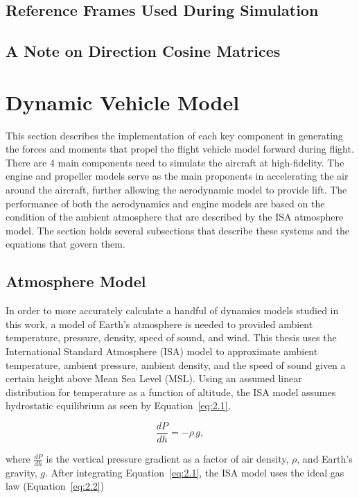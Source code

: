 \documentclass[12pt]{report}
\begin{document}
\subsection{Reference Frames Used During Simulation}

\subsection{A Note on Direction Cosine Matrices}

\section{Dynamic Vehicle Model}
This section describes the implementation of each key component in generating the forces and moments that propel the flight vehicle model forward during flight. There are 4 main components need to simulate the aircraft at high-fidelity. The engine and propeller models serve as the main proponents in accelerating the air around the aircraft, further allowing the aerodynamic model to provide lift. The performance of both the aerodynamics and engine models are based on the condition of the ambient atmosphere that are described by the ISA atmosphere model. The section holds several subsections that describe these systems and the equations that govern them.
\clearpage
\subsection{Atmosphere Model}
In order to more accurately calculate a handful of dynamics models studied in this work, a model of Earth's atmosphere is needed to provided ambient temperature, pressure, density, speed of sound, and wind. This thesis uses the International Standard Atmosphere (ISA) model to approximate ambient temperature, ambient pressure, ambient density, and the speed of sound given a certain height above Mean Sea Level (MSL). Using an assumed linear distribution for temperature as a function of altitude, the ISA model assumes hydrostatic equilibrium as seen by Equation~\ref{eq:2.1},

\begin{equation}
  \frac{dP}{dh} = -\rho \, g,
  \label{eq:2.1}
\end{equation}

where \(\frac{dP}{dh}\) is the vertical pressure gradient as a factor of air density, \( \rho \), and Earth's gravity, \(g\). After integrating Equation~\ref{eq:2.1}, the ISA model uses the ideal gas law (Equation~\ref{eq:2.2})
\end{document}
